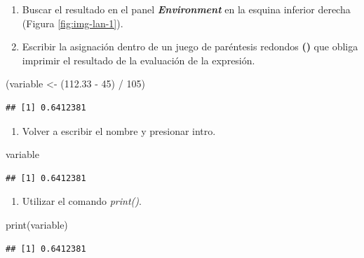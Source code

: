 \documentclass[
]{book}
\newenvironment{Shaded}{\begin{snugshade}}{\end{snugshade}}
\newcommand{\DecValTok}[1]{\textcolor[rgb]{0.00,0.00,0.81}{#1}}
\newcommand{\FloatTok}[1]{\textcolor[rgb]{0.00,0.00,0.81}{#1}}
\newcommand{\FunctionTok}[1]{\textcolor[rgb]{0.00,0.00,0.00}{#1}}
\newcommand{\NormalTok}[1]{#1}
\newcommand{\OtherTok}[1]{\textcolor[rgb]{0.56,0.35,0.01}{#1}}
\newcommand{\SpecialCharTok}[1]{\textcolor[rgb]{0.00,0.00,0.00}{#1}}
\providecommand{\tightlist}{%
  \setlength{\itemsep}{0pt}\setlength{\parskip}{0pt}}
\begin{document}
\begin{enumerate}
\def\labelenumi{\arabic{enumi}.}
\item
  Buscar el resultado en el panel \textbf{\emph{Environment}} en la esquina inferior derecha (Figura \ref{fig:img-lan-1}).
\item
  Escribir la asignación dentro de un juego de paréntesis redondos \textbf{()} que obliga imprimir el resultado de la evaluación de la expresión.
\end{enumerate}

\begin{Shaded}
\begin{Highlighting}[]
\NormalTok{(variable }\OtherTok{\textless{}{-}}\NormalTok{ (}\FloatTok{112.33} \SpecialCharTok{{-}} \DecValTok{45}\NormalTok{) }\SpecialCharTok{/} \DecValTok{105}\NormalTok{)}
\end{Highlighting}
\end{Shaded}

\begin{verbatim}
## [1] 0.6412381
\end{verbatim}

\begin{enumerate}
\def\labelenumi{\arabic{enumi}.}
\setcounter{enumi}{2}
\tightlist
\item
  Volver a escribir el nombre y presionar intro.
\end{enumerate}

\begin{Shaded}
\begin{Highlighting}[]
\NormalTok{variable}
\end{Highlighting}
\end{Shaded}

\begin{verbatim}
## [1] 0.6412381
\end{verbatim}

\begin{enumerate}
\def\labelenumi{\arabic{enumi}.}
\setcounter{enumi}{3}
\tightlist
\item
  Utilizar el comando \emph{print()}.
\end{enumerate}

\begin{Shaded}
\begin{Highlighting}[]
\FunctionTok{print}\NormalTok{(variable)}
\end{Highlighting}
\end{Shaded}

\begin{verbatim}
## [1] 0.6412381
\end{verbatim}
\end{document}
